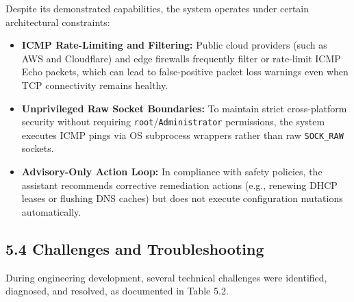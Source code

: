 \documentclass[
]{article}
\providecommand{\tightlist}{%
  \setlength{\itemsep}{0pt}\setlength{\parskip}{0pt}}
\begin{document}
Despite its demonstrated capabilities, the system operates under certain architectural constraints:
\begin{itemize}
\tightlist
\item \textbf{ICMP Rate-Limiting and Filtering:} Public cloud providers (such as AWS and Cloudflare) and edge firewalls frequently filter or rate-limit ICMP Echo packets, which can lead to false-positive packet loss warnings even when TCP connectivity remains healthy.
\item \textbf{Unprivileged Raw Socket Boundaries:} To maintain strict cross-platform security without requiring \texttt{root}/\texttt{Administrator} permissions, the system executes ICMP pings via OS subprocess wrappers rather than raw \texttt{SOCK\_RAW} sockets.
\item \textbf{Advisory-Only Action Loop:} In compliance with safety policies, the assistant recommends corrective remediation actions (e.g., renewing DHCP leases or flushing DNS caches) but does not execute configuration mutations automatically.
\end{itemize}

\subsection{5.4 Challenges and Troubleshooting}\label{challenges-and-troubleshooting}

During engineering development, several technical challenges were identified, diagnosed, and resolved, as documented in Table 5.2.
\end{document}
